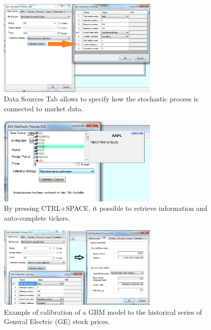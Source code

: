 \begin{figure}[h]
\begin{center}
\includegraphics[width=0.7\textwidth]{./Figures/DataSourcesTab.png}
\caption{Data Sources Tab allows to specify how the stochastic process is connected to market data.}
\label{fig.DataSourceTab}
\end{center}
\end{figure}

\begin{figure}[h]
\begin{center}
\includegraphics[width=0.7\textwidth]{./Figures/Autocomplete.png}
\caption{By pressing CTRL+SPACE, it possible to  retrieve information and auto-complete tickers.}
\label{fig.DataSourceTab}
\end{center}
\end{figure}


\begin{figure}[h]
\begin{center}
\includegraphics[width=0.7\textwidth]{./Figures/HistoricalCalibration.png}
\caption{Example of calibration of a GBM model to the historical series of General Electric (GE) stock prices.}
\label{fig.DataSourceTab}
\end{center}
\end{figure}





